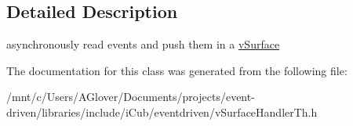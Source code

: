 \subsection{Detailed Description}
asynchronously read events and push them in a \hyperlink{classev_1_1vSurface}{v\+Surface} 

The documentation for this class was generated from the following file\+:\begin{DoxyCompactItemize}
\item 
/mnt/c/\+Users/\+A\+Glover/\+Documents/projects/event-\/driven/libraries/include/i\+Cub/eventdriven/v\+Surface\+Handler\+Th.\+h\end{DoxyCompactItemize}
